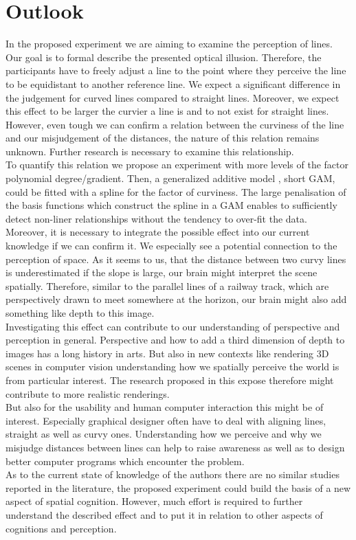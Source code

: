 \documentclass[a4paper, doc, draftall]{apa6}
\begin{document}
\section{Outlook}
	In the proposed experiment we are aiming to examine the perception of lines. Our goal is to formal describe the presented optical illusion. Therefore, the participants have to freely adjust a line to the point where they perceive the line to be equidistant to another reference line. We expect a significant difference in the judgement for curved lines compared to straight lines. Moreover, we expect this effect to be larger the curvier a line is and to not exist for straight lines.\\
	However, even tough we can confirm a relation between the curviness of the line and our misjudgement of the distances, the nature of this relation remains unknown. Further research is necessary to examine this relationship.\\
	To quantify this relation we propose an experiment with more levels of the factor polynomial degree/gradient. Then, a generalized additive model \parencite{wood2006generalized}, short GAM, could be fitted with a spline for the factor of curviness. The large penalisation of the basis functions which construct the spline in a GAM enables to sufficiently detect non-liner relationships without the tendency to over-fit the data.\\
	Moreover, it is necessary to integrate the possible effect into our current knowledge if we can confirm it. We especially see a potential connection to the perception of space. As it seems to us, that the distance between two curvy lines is underestimated if the slope is large, our brain might interpret the scene spatially. Therefore, similar to the parallel lines of a railway track, which are perspectively drawn to meet somewhere at the horizon, our brain might also add something like depth to this image.\\
	Investigating this effect can contribute to our understanding of perspective and perception in general. Perspective and how to add a third dimension of depth to images has a long history in arts. But also in new contexts like rendering 3D scenes in computer vision understanding how we spatially perceive the world is from particular interest. The research proposed in this expose therefore might contribute to more realistic renderings.\\
	But also for the usability and human computer interaction this might be of interest. Especially graphical designer often have to deal with aligning lines, straight as well as curvy ones. Understanding how we perceive and why we misjudge distances between lines can help to raise awareness as well as to design better computer programs which encounter the problem.\\
	As to the current state of knowledge of the authors there are no similar studies reported in the literature, the proposed experiment could build the basis of a new aspect of spatial cognition. However, much effort is required to further understand the described effect and to put it in relation to other aspects of cognitions and perception.
	
\end{document}
